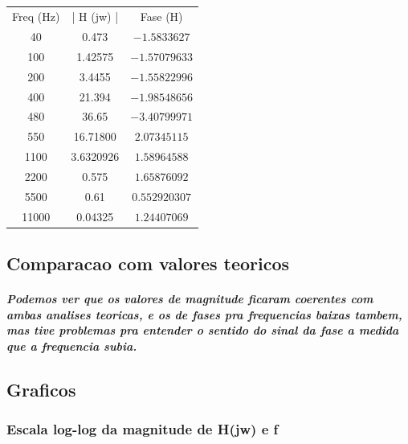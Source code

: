 \documentclass[12pt,twoside, a4paper, twocolumn]{article}
\begin{document}
\subparagraph*{}

\begin{center}
    \begin{tabular}{ |c|c|c| }
        \hline
        Freq (Hz) & | H (jw) | & Fase (H)      \\
        40        & 0.473      & $-1.5833627$  \\
        100       & 1.42575    & $-1.57079633$ \\
        200       & 3.4455     & $-1.55822996$ \\
        400       & 21.394     & $-1.98548656$ \\
        480       & 36.65      & $-3.40799971$ \\
        550       & 16.71800   & $2.07345115$  \\
        1100      & 3.6320926  & $ 1.58964588$ \\
        2200      & 0.575      & $1.65876092$  \\
        5500      & 0.61       & $0.552920307$ \\
        11000     & 0.04325    & $1.24407069$  \\
        \hline
    \end{tabular}
\end{center}

\subsection{Comparacao com valores teoricos}

\subparagraph*{Podemos ver que os valores de magnitude ficaram coerentes com ambas analises teoricas, e os de fases pra frequencias baixas tambem, mas tive problemas pra entender o sentido do sinal da fase a medida que a frequencia subia.}

\subsection{Graficos}

\subsubsection{Escala log-log da magnitude de H(jw) e f}
\end{document}
